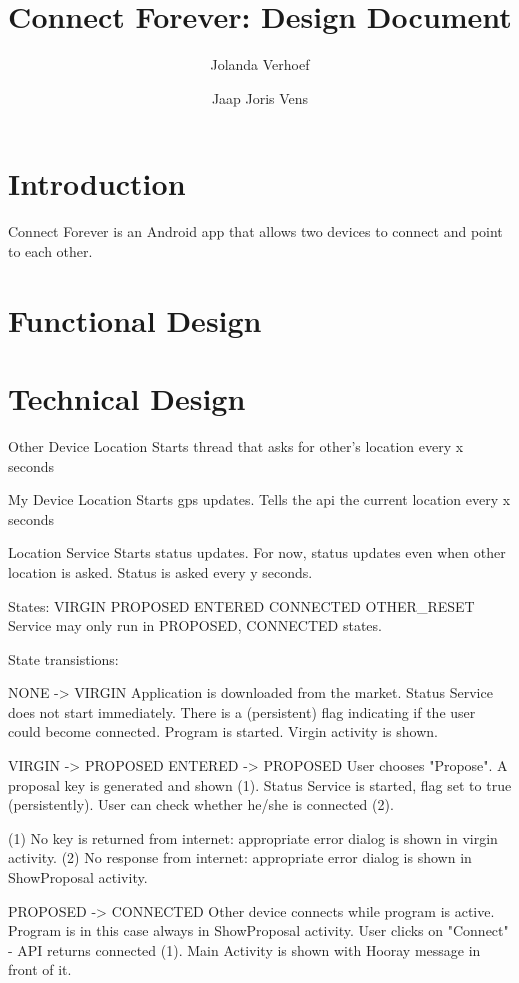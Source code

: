 \documentclass[a4paper,12pt]{article}
\title{Connect Forever: Design Document}
\author{Jolanda Verhoef \and Jaap Joris Vens}
\begin{document}
\maketitle

\section{Introduction}
Connect Forever is an Android app that allows two devices to connect and point to 
each other. 

\section{Functional Design}

\section{Technical Design}

Other Device Location
Starts thread that asks for other's location every x seconds

My Device Location
Starts gps updates. Tells the api the current location every x seconds

Location Service
Starts status updates. For now, status updates even when other location is
asked. Status is asked every y seconds.



States:
VIRGIN
PROPOSED
ENTERED
CONNECTED
OTHER_RESET
Service may only run in PROPOSED, CONNECTED states.

State transistions:

NONE -> VIRGIN
Application is downloaded from the market.
Status Service does not start immediately.
There is a (persistent) flag indicating if the user could become connected.
Program is started.
Virgin activity is shown.

  VIRGIN -> PROPOSED
  ENTERED -> PROPOSED
  User chooses "Propose".
  A proposal key is generated and shown (1).
  Status Service is started, flag set to true (persistently).
  User can check whether he/she is connected (2).
  
  (1) No key is returned from internet: appropriate error dialog is shown in
      virgin activity.
  (2) No response from internet: appropriate error dialog is shown in
      ShowProposal activity.
  
    PROPOSED -> CONNECTED
    Other device connects while program is active.
    Program is in this case always in ShowProposal activity.
    User clicks on "Connect" - API returns connected (1).
    Main Activity is shown with Hooray message in front of it.
    
\end{document}
